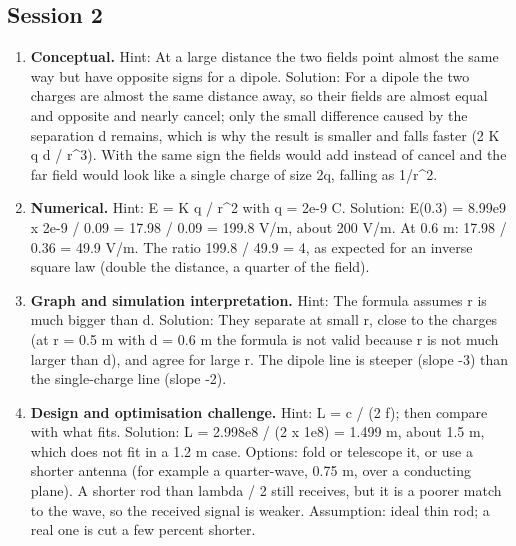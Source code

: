 \documentclass[11pt,a4paper]{article}
\begin{document}
\subsection*{Session 2}
\begin{enumerate}[nosep]
\item \textbf{Conceptual.} Hint: At a large distance the two fields point almost the same way but have opposite signs for a dipole. Solution: For a dipole the two charges are almost the same distance away, so their fields are almost equal and opposite and nearly cancel; only the small difference caused by the separation d remains, which is why the result is smaller and falls faster (2 K q d / r\textasciicircum{}3). With the same sign the fields would add instead of cancel and the far field would look like a single charge of size 2q, falling as 1/r\textasciicircum{}2.
\item \textbf{Numerical.} Hint: E = K q / r\textasciicircum{}2 with q = 2e-9 C. Solution: E(0.3) = 8.99e9 x 2e-9 / 0.09 = 17.98 / 0.09 = 199.8 V/m, about 200 V/m. At 0.6 m: 17.98 / 0.36 = 49.9 V/m. The ratio 199.8 / 49.9 = 4, as expected for an inverse square law (double the distance, a quarter of the field).
\item \textbf{Graph and simulation interpretation.} Hint: The formula assumes r is much bigger than d. Solution: They separate at small r, close to the charges (at r = 0.5 m with d = 0.6 m the formula is not valid because r is not much larger than d), and agree for large r. The dipole line is steeper (slope -3) than the single-charge line (slope -2).
\item \textbf{Design and optimisation challenge.} Hint: L = c / (2 f); then compare with what fits. Solution: L = 2.998e8 / (2 x 1e8) = 1.499 m, about 1.5 m, which does not fit in a 1.2 m case. Options: fold or telescope it, or use a shorter antenna (for example a quarter-wave, 0.75 m, over a conducting plane). A shorter rod than lambda / 2 still receives, but it is a poorer match to the wave, so the received signal is weaker. Assumption: ideal thin rod; a real one is cut a few percent shorter.
\end{enumerate}
\end{document}
